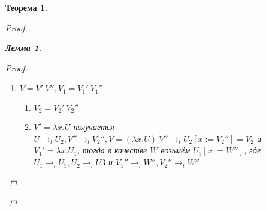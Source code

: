 \documentclass[10pt,twoside]{article}
\theoremstyle{plain}
\newtheorem{thm}{Теорема}
\newtheorem{lemma}{Лемма}
\theoremstyle{definition}
\begin{document}
\begin{thm}
\begin{proof}
\begin{lemma}
\begin{proof}
\begin{enumerate}
            \begin{center}
            \end{center}
          \item $V = V'\ V'',V_1 = V_1'\ V_1''$
            \begin{enumerate}
              \item $V_2 = V_2'\ V_2''$

                \begin{center}
                \end{center}
              \item $V' = \lambda x.U$ получается $U\to_l U_2,V''\to_l V_2'',V=(\lambda x.U)\ V''\to_l U_2[x:=V_2'']=V_2$ и $V_1' = \lambda x.U_1$, тогда в качестве $W$ возьмём $U_3[x:=W'']$, где $U_1\to_l U_3, U_2\to_l U3$ и $V_1''\to_l W'',V_2''\to_l W''$.


\end{enumerate}
\end{enumerate}
\end{proof}
\end{lemma}
\end{proof}
\end{thm}
\end{document}
